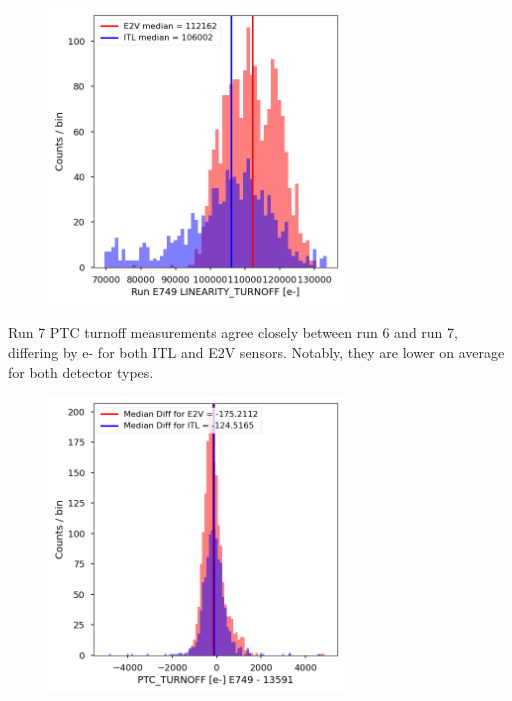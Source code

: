 \begin{figure}[H]
\begin{centering}
\includegraphics[width=0.7\textwidth]{sections/figures/baselineCharacterization/LINEARITY_TURNOFF_E749_sensorType.png}
\end{centering}
\end{figure}

Run 7 PTC turnoff measurements agree closely between run 6 and run 7, differing by  e- for both ITL and E2V sensors. Notably, they are lower on average for both detector types.

\begin{figure}[H]
\begin{centering}
\includegraphics[width=0.7\textwidth]{sections/figures/baselineCharacterization/PTC_TURNOFF_13591_E749_diff.png}
\end{centering}
\end{figure}

